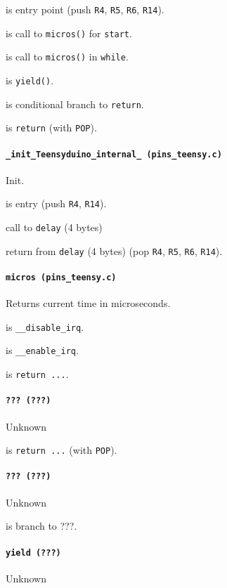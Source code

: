  is entry point (push \texttt{R4}, \texttt{R5},
\texttt{R6}, \texttt{R14}).

 is call to \texttt{micros()} for \texttt{start}.

 is call to \texttt{micros()} in \texttt{while}.

 is \texttt{yield()}.

 is conditional branch to \texttt{return}.

 is \texttt{return} (with \texttt{POP}).

\paragraph{\texttt{\_init\_Teensyduino\_internal\_ (pins\_teensy.c)}}
Init.

 is entry (push \texttt{R4}, \texttt{R14}).

 call to \texttt{delay} (4 bytes)

 return from \texttt{delay} (4 bytes) (pop \texttt{R4},
\texttt{R5}, \texttt{R6}, \texttt{R14}).


\paragraph{\texttt{micros (pins\_teensy.c)}} Returns current time in
microseconds.

 is \texttt{\_\_disable\_irq}.

 is \texttt{\_\_enable\_irq}.

 is \texttt{return ...}.

\paragraph{\texttt{??? (???)}} Unknown

 is \texttt{return ...} (with \texttt{POP}).

\paragraph{\texttt{??? (???)}} Unknown

 is branch to ???.

\paragraph{\texttt{yield (???)}} Unknown

